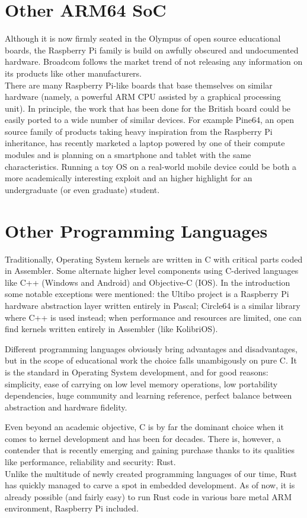 \documentclass[12pt,a4paper,openright,twoside]{report}
\begin{document}
\section{Other ARM64 SoC}
Although it is now firmly seated in the Olympus of open source educational boards,
the Raspberry Pi family is build on awfully obscured and undocumented hardware.
Broadcom follows the market trend of not releasing any information on its 
products like other manufacturers.\\

There are many Raspberry Pi-like boards that base themselves on similar hardware
(namely, a powerful ARM CPU assisted by a graphical processing unit). In principle,
the work that has been done for the British board could be easily ported to a 
wide number of similar devices. For example Pine64, an open source family of products
taking heavy inspiration from the Raspberry Pi inheritance, has recently
marketed a laptop powered by one of their compute modules and is planning on 
a smartphone and tablet with the same characteristics. Running a toy
OS on a real-world mobile device could be both a more academically interesting 
exploit and an higher highlight for an undergraduate (or even graduate) student.

\section{Other Programming Languages}
Traditionally, Operating System kernels are written in C with critical parts
coded in Assembler. Some alternate higher level components using C-derived 
languages like C++ (Windows and Android) and Objective-C (IOS).
In the introduction some notable exceptions were mentioned: the Ultibo project 
\cite{ultibo} is a Raspberry Pi hardware abstraction layer written entirely in 
Pascal; Circle64 \cite{circle} is a similar library where C++ is used instead;
 when performance and resources are limited, one can find kernels written
entirely in Assembler (like KolibriOS).

Different programming languages obviously bring advantages and disadvantages,
but in the scope of educational work the choice falls unambigously on pure C.
It is the standard in Operating System development, and for good reasons:
simplicity, ease of carrying on low level memory operations, low portability 
dependencies, huge community and learning reference, perfect balance 
between abstraction and hardware fidelity.

Even beyond an academic objective, C is by far the dominant choice when it 
comes to kernel development and has been for decades. There is, however, a
contender that is recently emerging and gaining purchase thanks to its qualities
like performance, reliability and security: Rust.\\
Unlike the multitude of newly created programming languages of our time, Rust
has quickly managed to carve a spot in embedded development. As of now, it is 
already possible (and fairly easy) to run Rust code in various bare metal ARM
environment, Raspberry Pi included.
\end{document}

